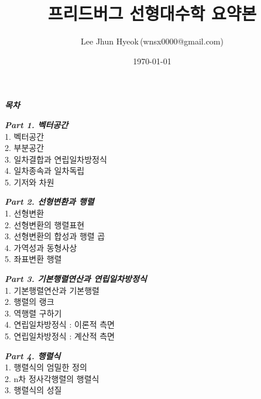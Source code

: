 \documentclass[10pt, a4paper]{article}
\title{\textbf{{\Huge 프리드버그 선형대수학 요약본}}}
\author{Lee Jhun Hyeok\,(wnsx0000@gmail.com)}
\date{\today}
\begin{document}
\maketitle

\textbf{\textit{목차}}

\textbf{\textit{Part 1. 벡터공간\\}}
1. 벡터공간\\
2. 부분공간\\
3. 일차결합과 연립일차방정식\\
4. 일차종속과 일차독립\\
5. 기저와 차원

\textbf{\textit{Part 2. 선형변환과 행렬\\}}
1. 선형변환\\
2. 선형변환의 행렬표현\\
3. 선형변환의 합성과 행렬 곱\\
4. 가역성과 동형사상\\
5. 좌표변환 행렬

\textbf{\textit{Part 3. 기본행렬연산과 연립일차방정식\\}}
1. 기본행렬연산과 기본행렬\\
2. 행렬의 랭크\\
3. 역행렬 구하기\\
4. 연립일차방정식 : 이론적 측면\\
5. 연립일차방정식 : 계산적 측면

\textbf{\textit{Part 4. 행렬식\\}}
1. 행렬식의 엄밀한 정의\\
2. n차 정사각행렬의 행렬식\\
3. 행렬식의 성질


\newpage











\end{document}
